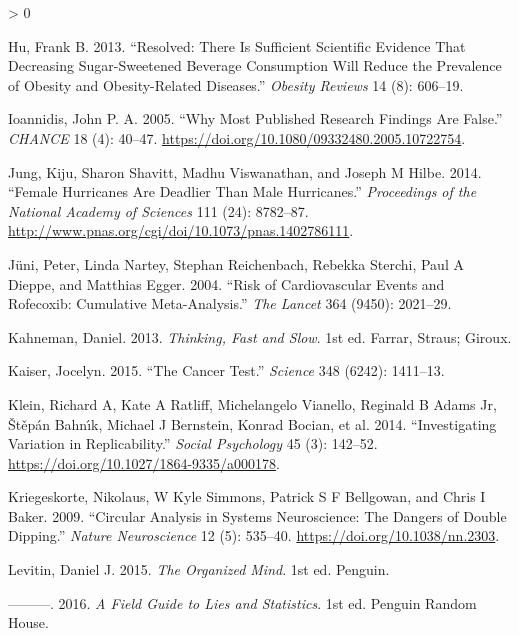 \documentclass[
  10pt,
  b5paper]{book}
\newlength{\cslhangindent}
\newenvironment{CSLReferences}[2] %
 {%
  \setlength{\parindent}{0pt}
  \ifodd #1 \everypar{\setlength{\hangindent}{\cslhangindent}}\ignorespaces\fi
  \ifnum #2 > 0
  \setlength{\parskip}{#2\baselineskip}
  \fi
 }%
 {}
\begin{document}
\begin{CSLReferences}{1}{0}
\leavevmode\hypertarget{ref-hu2013resolved}{}%
Hu, Frank B. 2013. {``Resolved: There Is Sufficient Scientific Evidence That Decreasing Sugar-Sweetened Beverage Consumption Will Reduce the Prevalence of Obesity and Obesity-Related Diseases.''} \emph{Obesity Reviews} 14 (8): 606--19.

\leavevmode\hypertarget{ref-r19_ioannidis_2005}{}%
Ioannidis, John P. A. 2005. {``Why Most Published Research Findings Are False.''} \emph{CHANCE} 18 (4): 40--47. \url{https://doi.org/10.1080/09332480.2005.10722754}.

\leavevmode\hypertarget{ref-jung2014female}{}%
Jung, Kiju, Sharon Shavitt, Madhu Viswanathan, and Joseph M Hilbe. 2014. {``Female Hurricanes Are Deadlier Than Male Hurricanes.''} \emph{Proceedings of the National Academy of Sciences} 111 (24): 8782--87. \url{http://www.pnas.org/cgi/doi/10.1073/pnas.1402786111}.

\leavevmode\hypertarget{ref-juni2004risk}{}%
Jüni, Peter, Linda Nartey, Stephan Reichenbach, Rebekka Sterchi, Paul A Dieppe, and Matthias Egger. 2004. {``Risk of Cardiovascular Events and Rofecoxib: Cumulative Meta-Analysis.''} \emph{The Lancet} 364 (9450): 2021--29.

\leavevmode\hypertarget{ref-kahneman_2013}{}%
Kahneman, Daniel. 2013. \emph{Thinking, Fast and Slow}. 1st ed. Farrar, Straus; Giroux.

\leavevmode\hypertarget{ref-r5_kaiser_2015}{}%
Kaiser, Jocelyn. 2015. {``The Cancer Test.''} \emph{Science} 348 (6242): 1411--13.

\leavevmode\hypertarget{ref-r7_klein_others_2014}{}%
Klein, Richard A, Kate A Ratliff, Michelangelo Vianello, Reginald B Adams Jr, Štěpán Bahnı́k, Michael J Bernstein, Konrad Bocian, et al. 2014. {``Investigating Variation in Replicability.''} \emph{Social Psychology} 45 (3): 142--52. \url{https://doi.org/10.1027/1864-9335/a000178}.

\leavevmode\hypertarget{ref-r8_kriegeskorte_simmons_bellgowan_baker_2009}{}%
Kriegeskorte, Nikolaus, W Kyle Simmons, Patrick S F Bellgowan, and Chris I Baker. 2009. {``Circular Analysis in Systems Neuroscience: The Dangers of Double Dipping.''} \emph{Nature Neuroscience} 12 (5): 535--40. \url{https://doi.org/10.1038/nn.2303}.

\leavevmode\hypertarget{ref-levitin_2015}{}%
Levitin, Daniel J. 2015. \emph{The Organized Mind}. 1st ed. Penguin.

\leavevmode\hypertarget{ref-levitin_2016}{}%
---------. 2016. \emph{A Field Guide to Lies and Statistics}. 1st ed. Penguin Random House.


\end{CSLReferences}
\end{document}
